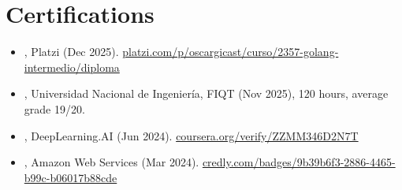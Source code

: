 \section{Certifications}

\begin{itemize}
  \item {}, Platzi (Dec 2025). \href{https://platzi.com/p/oscargicast/curso/2357-golang-intermedio/diploma/detalle/}{platzi.com/p/oscargicast/curso/2357-golang-intermedio/diploma}
  \item {}, Universidad Nacional de Ingeniería, FIQT (Nov 2025), 120 hours, average grade 19/20.
  \item {}, DeepLearning.AI (Jun 2024). \href{https://www.coursera.org/account/accomplishments/verify/ZZMM346D2N7T}{coursera.org/verify/ZZMM346D2N7T}
  \item {}, Amazon Web Services (Mar 2024). \href{https://www.credly.com/badges/9b39b6f3-2886-4465-b99c-b06017b88cde/linked_in_profile}{credly.com/badges/9b39b6f3-2886-4465-b99c-b06017b88cde}
\end{itemize}
